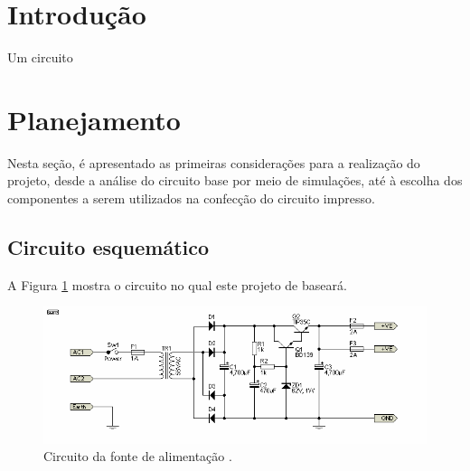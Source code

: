 \documentclass[a4paper,12pt,oneside,openany,table,xcdraw]{article}
\begin{document}
\newcommand{\thedepartment}{Faculdade de Engenharia Elétrica}
\newcommand{\thecourse}{FEELT}
\newcommand{\thetitle}{FONTE DE ALIMENTAÇÃO}
\newcommand{\thetype}{Relatório da Disciplina de Circuitos Elétricos II}
\newcommand{\theproftitle}{Bacharel em Engenharia Elétrica}
\newcommand{\thestudent}{Lesly Viviane Montúfar Berrios \_ 
11811ETE001\\Ana Júlia Santana \_ 
11811ETE013}
\newcommand{\theadvisor}{Prof. Daniel Pereira de Carvalho}
\newcommand{\thecity}{Uberlândia}

\thispagestyle{empty}


\onehalfspacing
\tableofcontents %
\newpage

\section{Introdução}
Um circuito

\section{Planejamento} %
Nesta seção, é apresentado as primeiras considerações para a realização do projeto, desde a análise do circuito base por meio de simulações, até à escolha dos componentes a serem utilizados na confecção do circuito impresso.

\subsection{Circuito esquemático}
A Figura \ref{circuito} mostra o circuito no qual este projeto de baseará.

\begin{figure}[H]
\centering
\captionsetup{font=scriptsize}
\includegraphics[width=16cm]{fonte}
\caption{Circuito da fonte de alimentação \cite{amp}.}
\label{circuito}
\end{figure}
\end{document}
